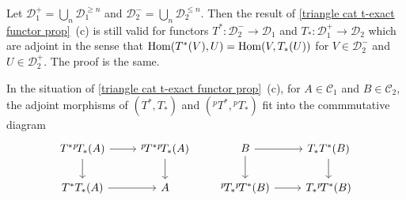 \begin{remark}
Let $\mathcal{D}_1^+=\bigcup_n\mathcal{D}_1^{\geq n}$ and $\mathcal{D}_2^-=\bigcup_n\mathcal{D}_2^{\leq n}$. Then the result of \cref{triangle cat t-exact functor prop}~(c) is still valid for functors $T^*:\mathcal{D}_2^{-}\to\mathcal{D}_1$ and $T_*:\mathcal{D}_1^{+}\to\mathcal{D}_2$ which are adjoint in the sense that $\mathrm{Hom}(T^*(V),U)=\mathrm{Hom}(V,T_*(U))$ for $V\in\mathcal{D}_2^-$ and $U\in\mathcal{D}_2^+$. The proof is the same.
\end{remark}

\begin{remark}\label{triangle cat adjoint functor ^pT diagram}
In the situation of \cref{triangle cat t-exact functor prop}~(c), for $A\in\mathcal{C}_1$ and $B\in\mathcal{C}_2$, the adjoint morphisms of $(T^*,T_*)$ and $({^p\!T^*},{^p\!T_*})$ fit into the commmutative diagram
\[\begin{tikzcd}
T^*{^p\!T_*}(A)\ar[d]\ar[r]&{^p\!T^*}{^p\!T_*}(A)\ar[d]\\
T^*T_*(A)\ar[r]&A
\end{tikzcd}\quad\quad
\begin{tikzcd}
B\ar[r]\ar[d]&T_*T^*(B)\ar[d]\\
{^p\!T_*}{^p\!T^*}(B)\ar[r]&T_*{^p\!T^*}(B)
\end{tikzcd}\]
\end{remark}

